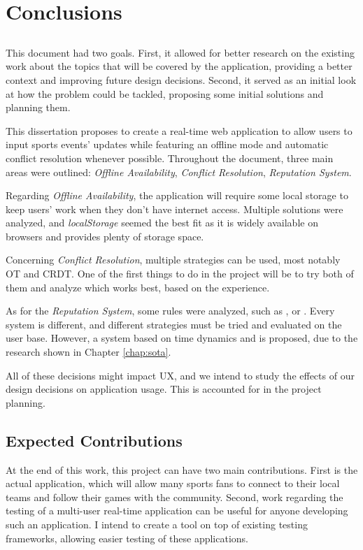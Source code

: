 \chapter{Conclusions} \label{chap:concl}

\section*{}

This document had two goals. First, it allowed for better research on the existing work about the topics that will be covered by the application, providing a better context and improving future design decisions. Second, it served as an initial look at how the problem could be tackled, proposing some initial solutions and planning them.

This dissertation proposes to create a real-time web application to allow users to input sports events' updates while featuring an offline mode and automatic conflict resolution whenever possible. Throughout the document, three main areas were outlined: \textit{Offline Availability}, \textit{Conflict Resolution}, \textit{Reputation System}. 

Regarding \textit{Offline Availability}, the application will require some local storage to keep users' work when they don't have internet access. Multiple solutions were analyzed, and \textit{localStorage} seemed the best fit as it is widely available on browsers and provides plenty of storage space.

Concerning \textit{Conflict Resolution}, multiple strategies can be used, most notably OT and CRDT. One of the first things to do in the project will be to try both of them and analyze which works best, based on the experience.

As for the \textit{Reputation System}, some rules were analyzed, such as , or . Every system is different, and different strategies must be tried and evaluated on the user base. However, a system based on time dynamics and  is proposed, due to the research shown in Chapter \ref{chap:sota}.

All of these decisions might impact UX, and we intend to study the effects of our design decisions on application usage. This is accounted for in the project planning.

\section{Expected Contributions}
At the end of this work, this project can have two main contributions. First is the actual application, which will allow many sports fans to connect to their local teams and follow their games with the community. Second, work regarding the testing of a multi-user real-time application can be useful for anyone developing such an application. I intend to create a tool on top of existing testing frameworks, allowing easier testing of these applications.

\vspace*{12mm}